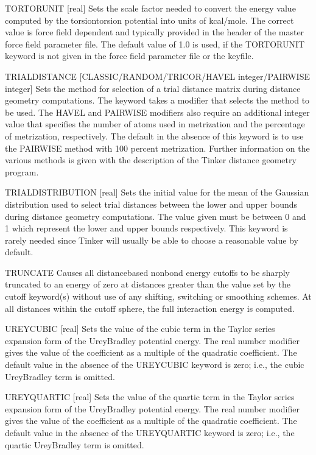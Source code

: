 \documentclass[letterpaper,11pt,english]{sphinxmanual}
\begin{document}
TORTORUNIT {[}real{]}     Sets the scale factor needed to convert the energy value computed by the torsion\sphinxhyphen{}torsion potential into units of kcal/mole. The correct value is force field dependent and typically provided in the header of the master force field parameter file. The default value of 1.0 is used, if the TORTORUNIT keyword is not given in the force field parameter file or the keyfile.

TRIAL\sphinxhyphen{}DISTANCE              {[}CLASSIC/RANDOM/TRICOR/HAVEL integer/PAIRWISE integer{]}     Sets the method for selection of a trial distance matrix during distance geometry computations. The keyword takes a modifier that selects the method to be used. The HAVEL and PAIRWISE modifiers also require an additional integer value that specifies the number of atoms used in metrization and the percentage of metrization, respectively. The default in the absence of this keyword is to use the PAIRWISE method with 100 percent metrization. Further information on the various methods is given with the description of the Tinker distance geometry program.

TRIAL\sphinxhyphen{}DISTRIBUTION {[}real{]}     Sets the initial value for the mean of the Gaussian distribution used to select trial distances between the lower and upper bounds during distance geometry computations. The value given must be between 0 and 1 which represent the lower and upper bounds respectively. This keyword is rarely needed since Tinker will usually be able to choose a reasonable value by default.

TRUNCATE     Causes all distance\sphinxhyphen{}based nonbond energy cutoffs to be sharply truncated to an energy of zero at distances greater than the value set by the cutoff keyword(s) without use of any shifting, switching or smoothing schemes. At all distances within the cutoff sphere, the full interaction energy is computed.

UREY\sphinxhyphen{}CUBIC {[}real{]}     Sets the value of the cubic term in the Taylor series expansion form of the Urey\sphinxhyphen{}Bradley potential energy. The real number modifier gives the value of the coefficient as a multiple of the quadratic coefficient. The default value in the absence of the UREY\sphinxhyphen{}CUBIC keyword is zero; i.e., the cubic Urey\sphinxhyphen{}Bradley term is omitted.

UREY\sphinxhyphen{}QUARTIC {[}real{]}     Sets the value of the quartic term in the Taylor series expansion form of the Urey\sphinxhyphen{}Bradley potential energy. The real number modifier gives the value of the coefficient as a multiple of the quadratic coefficient. The default value in the absence of the UREY\sphinxhyphen{}QUARTIC keyword is zero; i.e., the quartic Urey\sphinxhyphen{}Bradley term is omitted.
\end{document}
